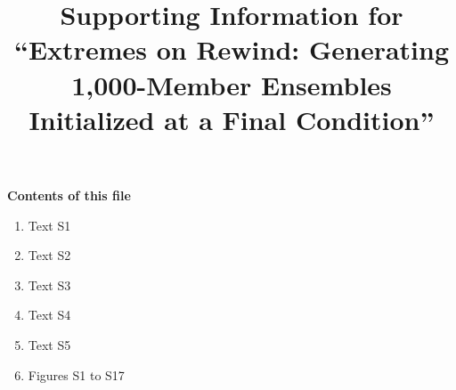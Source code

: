 %

\graphicspath{{figures/}} %
\raggedbottom

\setcounter{equation}{0}
\renewcommand{\theequation}{S\arabic{equation}}
\setcounter{figure}{0}
\renewcommand{\thefigure}{S\arabic{figure}}


\title{Supporting Information for ``Extremes on Rewind: Generating 1,000-Member Ensembles Initialized at a Final Condition''}






\noindent\textbf{Contents of this file}
\begin{enumerate}
\item Text S1
\item Text S2
\item Text S3
\item Text S4
\item Text S5
\item Figures S1 to S17
\end{enumerate}

